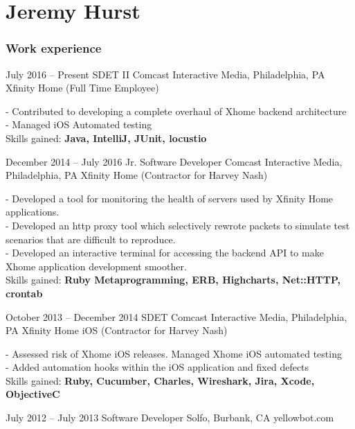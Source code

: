 \documentclass{tccv}
\begin{document}
\part{Jeremy Hurst}

\section{Work experience}

\begin{eventlist}

\item{July 2016 -- Present}
     {SDET II}
     {Comcast Interactive Media, Philadelphia, PA}
     {Xfinity Home (Full Time Employee)}

- Contributed to developing a complete overhaul of Xhome backend architecture \\
- Managed iOS Automated testing \\
Skills gained: \textbf{Java, IntelliJ, JUnit, locustio}

\item{December 2014 -- July 2016}
     {Jr. Software Developer}
     {Comcast Interactive Media, Philadelphia, PA}
     {Xfinity Home (Contractor for Harvey Nash)}

- Developed a tool for monitoring the health of servers used by Xfinity Home applications. \\
- Developed an http proxy tool which selectively rewrote packets to simulate test scenarios that are difficult to reproduce. \\
- Developed an interactive terminal for accessing the backend API to make Xhome application development smoother. \\
Skills gained: \textbf{Ruby Metaprogramming, ERB, Highcharts, Net::HTTP, crontab}

\item{October 2013 -- December 2014}
     {SDET}
     {Comcast Interactive Media, Philadelphia, PA}
     {Xfinity Home iOS (Contractor for Harvey Nash)}

- Assessed risk of Xhome iOS releases. Managed Xhome iOS automated testing \\
- Added automation hooks within the iOS application and fixed defects \\
Skills gained: \textbf{Ruby, Cucumber, Charles, Wireshark, Jira, Xcode, ObjectiveC}

\item{July 2012 -- July 2013}
     {Software Developer}
     {Solfo, Burbank, CA}
     {yellowbot.com}


\end{eventlist}
\end{document}
